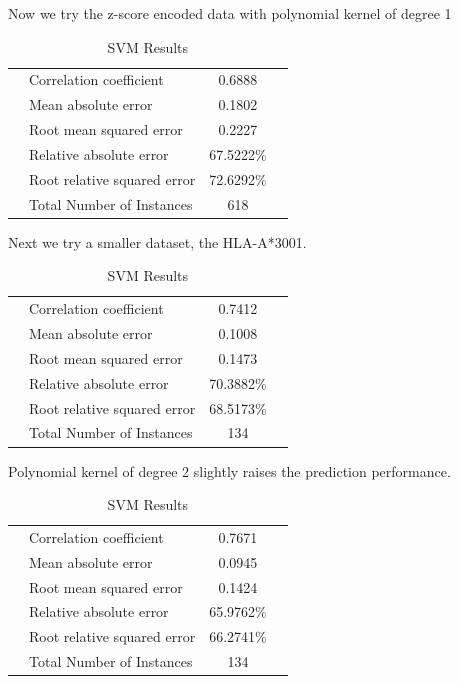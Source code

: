 Now we try the z-score encoded data with polynomial kernel of degree 1

\begin{table}[ht]
\begin{center}
\begin{tabular}{ ll c r }
\hline
 & Correlation coefficient   &              0.6888 \\
 & Mean absolute error        &              0.1802 \\
 & Root mean squared error    &              0.2227 \\
 & Relative absolute error    &             67.5222\% \\
 & Root relative squared error &             72.6292\% \\
 & Total Number of Instances   &           618     \\
\hline
\end{tabular}
\label{fig:svm5}
\caption{SVM Results}
\end{center}
\end{table}

Next we try a smaller dataset, the HLA-A*3001.

\begin{table}[ht]
\begin{center}
\begin{tabular}{ ll c r }
\hline
 & Correlation coefficient       &           0.7412 \\
 & Mean absolute error            &          0.1008 \\
 & Root mean squared error        &          0.1473 \\
 & Relative absolute error        &         70.3882\% \\
 & Root relative squared error    &         68.5173\% \\
 & Total Number of Instances      &        134 \\
\hline
\end{tabular}
\label{fig:svm6}
\caption{SVM Results}
\end{center}
\end{table}

Polynomial kernel of degree 2 slightly raises the prediction performance.

\begin{table}[ht]
\begin{center}
\begin{tabular}{ ll c r }
\hline
 & Correlation coefficient        &          0.7671 \\
 & Mean absolute error            &          0.0945 \\
 & Root mean squared error        &          0.1424 \\
 & Relative absolute error        &         65.9762\% \\
 & Root relative squared error    &         66.2741\% \\
 & Total Number of Instances      &        134 \\
\hline
\end{tabular}
\label{fig:svm7}
\caption{SVM Results}
\end{center}
\end{table}

